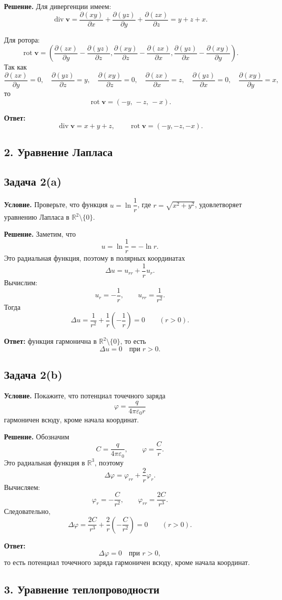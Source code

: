 \documentclass[a4paper,12pt]{article}
\newcommand{\R}{\mathbb{R}}
\newcommand{\diver}{\operatorname{div}}
\newcommand{\rot}{\operatorname{rot}}
\newcommand{\Task}[2]{\subsection*{Задача #1}\textbf{Условие.} #2}
\newcommand{\Solution}{\textbf{Решение.}}
\begin{document}
\Solution
Для дивергенции имеем:
\[
\diver \mathbf{v}
=\frac{\partial (xy)}{\partial x}
+\frac{\partial (yz)}{\partial y}
+\frac{\partial (zx)}{\partial z}
=y+z+x.
\]

Для ротора:
\[
\rot \mathbf{v}
=
\left(
\frac{\partial (zx)}{\partial y}-\frac{\partial (yz)}{\partial z},
\frac{\partial (xy)}{\partial z}-\frac{\partial (zx)}{\partial x},
\frac{\partial (yz)}{\partial x}-\frac{\partial (xy)}{\partial y}
\right).
\]
Так как
\[
\frac{\partial (zx)}{\partial y}=0,\quad
\frac{\partial (yz)}{\partial z}=y,\quad
\frac{\partial (xy)}{\partial z}=0,\quad
\frac{\partial (zx)}{\partial x}=z,\quad
\frac{\partial (yz)}{\partial x}=0,\quad
\frac{\partial (xy)}{\partial y}=x,
\]
то
\[
\rot \mathbf{v}=(-y,\,-z,\,-x).
\]

\textbf{Ответ:}
\[
\diver \mathbf{v}=x+y+z,
\qquad
\rot \mathbf{v}=(-y,-z,-x).
\]

\subsection*{2. Уравнение Лапласа}

\Task{2(a)}{Проверьте, что функция $u=\ln\dfrac{1}{r}$, где $r=\sqrt{x^2+y^2}$, удовлетворяет уравнению Лапласа в $\R^2\setminus\{0\}$.}

\Solution
Заметим, что
\[
u=\ln \frac{1}{r}=-\ln r.
\]
Это радиальная функция, поэтому в полярных координатах
\[
\Delta u=u_{rr}+\frac{1}{r}u_r.
\]
Вычислим:
\[
u_r=-\frac{1}{r}, \qquad
u_{rr}=\frac{1}{r^2}.
\]
Тогда
\[
\Delta u=\frac{1}{r^2}+\frac{1}{r}\left(-\frac{1}{r}\right)=0
\qquad (r>0).
\]

\textbf{Ответ:} функция гармонична в $\R^2\setminus\{0\}$, то есть
\[
\Delta u=0 \quad \text{при } r>0.
\]

\Task{2(b)}{Покажите, что потенциал точечного заряда
\[
\varphi=\frac{q}{4\pi\varepsilon_0 r}
\]
гармоничен всюду, кроме начала координат.}

\Solution
Обозначим
\[
C=\frac{q}{4\pi\varepsilon_0},
\qquad
\varphi=\frac{C}{r}.
\]
Это радиальная функция в $\R^3$, поэтому
\[
\Delta \varphi=\varphi_{rr}+\frac{2}{r}\varphi_r.
\]
Вычисляем:
\[
\varphi_r=-\frac{C}{r^2}, \qquad
\varphi_{rr}=\frac{2C}{r^3}.
\]
Следовательно,
\[
\Delta \varphi
=\frac{2C}{r^3}+\frac{2}{r}\left(-\frac{C}{r^2}\right)=0
\qquad (r>0).
\]

\textbf{Ответ:}
\[
\Delta \varphi=0 \quad \text{при } r>0,
\]
то есть потенциал точечного заряда гармоничен всюду, кроме начала координат.

\subsection*{3. Уравнение теплопроводности}
\end{document}

